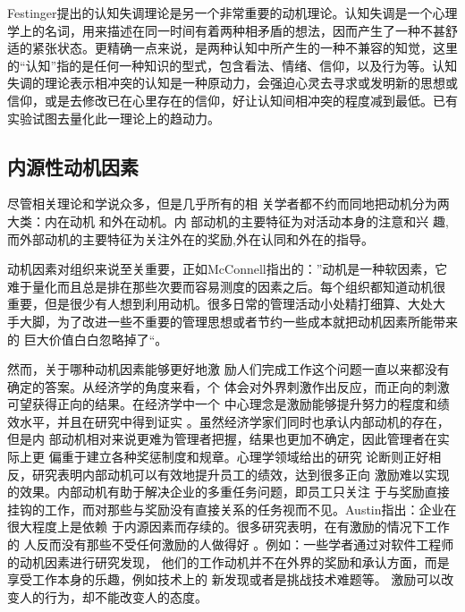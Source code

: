 \documentclass[12pt,a4paper]{ctexart}
\begin{document}
Festinger提出的认知失调理论是另一个非常重要的动机理论。认知失调是一个心理学上的名词，用来描述在同一时间有着两种相矛盾的想法，因而产生了一种不甚舒适的紧张状态。更精确一点来说，是两种认知中所产生的一种不兼容的知觉，这里的“认知”指的是任何一种知识的型式，包含看法、情绪、信仰，以及行为等。认知失调的理论表示相冲突的认知是一种原动力，会强迫心灵去寻求或发明新的思想或信仰，或是去修改已在心里存在的信仰，好让认知间相冲突的程度减到最低。已有实验试图去量化此一理论上的趋动力\cite{aronson1969tcd}。

\subsection{内源性动机因素}


尽管相关理论和学说众多，但是几乎所有的相
关学者都不约而同地把动机分为两大类：内在动机
和外在动机\cite{sansone2000iae}。内
部动机的主要特征为对活动本身的注意和兴
趣,而外部动机的主要特征为关注外在的奖励,外在认同和外在的指导\cite{collins1999mac}。

动机因素对组织来说至关重要，正如McConnell指出的：”动机是一种软因素，它
难于量化而且总是排在那些次要而容易测度的因素之后。每个组织都知道动机很
重要，但是很少有人想到利用动机。很多日常的管理活动小处精打细算、大处大
手大脚，为了改进一些不重要的管理思想或者节约一些成本就把动机因素所能带来的
巨大价值白白忽略掉了“\cite{663801}。

然而，关于哪种动机因素能够更好地激
励人们完成工作这个问题一直以来都没有确定的答案。从经济学的角度来看，个
体会对外界刺激作出反应，而正向的刺激可望获得正向的结果。在经济学中一个
中心理念是激励能够提升努力的程度和绩效水平，并且在研究中得到证实
\cite{388530120001201}。虽然经济学家们同时也承认内部动机的存在，但是内
部动机相对来说更难为管理者把握，结果也更加不确定，因此管理者在实际上更
偏重于建立各种奖惩制度和规章\cite{argyris1998ee}。心理学领域给出的研究
论断则正好相反，研究表明内部动机可以有效地提升员工的绩效，达到很多正向
激励难以实现的效果。内部动机有助于解决企业的多重任务问题\cite{gibbons1998io}\cite{holmstrom1991mpa}\cite{prendergast1999pif}，即员工只关注
于与奖励直接挂钩的工作，而对那些与奖励没有直接关系的任务视而不见。Austin指出：企业在很大程度上是依赖
于内源因素而存续的\cite{austin1996mam}。很多研究表明，在有激励的情况下工作的
人反而没有那些不受任何激励的人做得好
\cite{Deci1975}\cite{wilson1981aas}\cite{kruglanski1971eei}\cite{lepper1973ucs}
。例如：一些学者通过对软件工程师的动机因素进行研究发现，
他们的工作动机并不在外界的奖励和承认方面，而是享受工作本身的乐趣，例如技术上的
新发现或者是挑战技术难题等\cite{1252263}\cite{1125221}。
激励可以改变人的行为，却不能改变人的态度。
\end{document}
